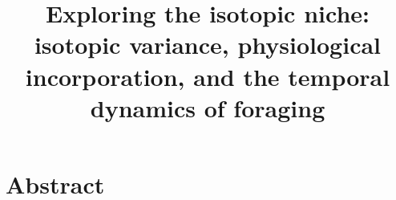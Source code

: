 \documentclass{article}
\begin{document}
\onecolumn

\title{Exploring the isotopic niche: isotopic variance, physiological incorporation, and the temporal dynamics of foraging}
%
%
%

\maketitle


%

\section*{Abstract}
\end{document}
